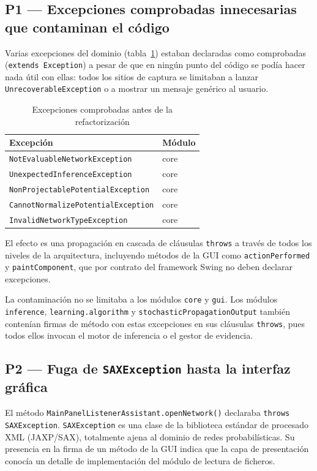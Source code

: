 \documentclass[12pt,a4paper]{article}
\begin{document}
\subsection{P1 — Excepciones comprobadas innecesarias que contaminan el código}

Varias excepciones del dominio (tabla~\ref{tab:checked-antes}) estaban declaradas
como comprobadas (\texttt{extends Exception}) a pesar de que en ningún punto del
código se podía hacer nada útil con ellas: todos los sitios de captura se
limitaban a lanzar \texttt{UnrecoverableException} o a mostrar un mensaje
genérico al usuario.

\begin{table}[H]
\centering
\begin{tabular}{ll}
\toprule
Excepción & Módulo \\
\midrule
\texttt{NotEvaluableNetworkException} & core \\
\texttt{UnexpectedInferenceException} & core \\
\texttt{NonProjectablePotentialException} & core \\
\texttt{CannotNormalizePotentialException} & core \\
\texttt{InvalidNetworkTypeException} & core \\
\bottomrule
\end{tabular}
\caption{Excepciones comprobadas antes de la refactorización}
\label{tab:checked-antes}
\end{table}

El efecto es una propagación en cascada de cláusulas \texttt{throws} a través
de todos los niveles de la arquitectura, incluyendo métodos de la GUI como
\texttt{actionPerformed} y \texttt{paintComponent}, que por contrato del
framework Swing no deben declarar excepciones.

La contaminación no se limitaba a los módulos \texttt{core} y \texttt{gui}.
Los módulos \texttt{inference}, \texttt{learning.algorithm} y
\texttt{stochasticPropagationOutput} también contenían firmas de método con
estas excepciones en sus cláusulas \texttt{throws}, pues todos ellos invocan
el motor de inferencia o el gestor de evidencia.

\subsection{P2 — Fuga de \texttt{SAXException} hasta la interfaz gráfica}

El método \texttt{MainPanelListenerAssistant.openNetwork()} declaraba
\texttt{throws SAXException}. \texttt{SAXException} es una clase de la
biblioteca estándar de procesado XML (JAXP/SAX), totalmente ajena al dominio de
redes probabilísticas. Su presencia en la firma de un método de la GUI indica
que la capa de presentación conocía un detalle de implementación del módulo de
lectura de ficheros.
\end{document}
